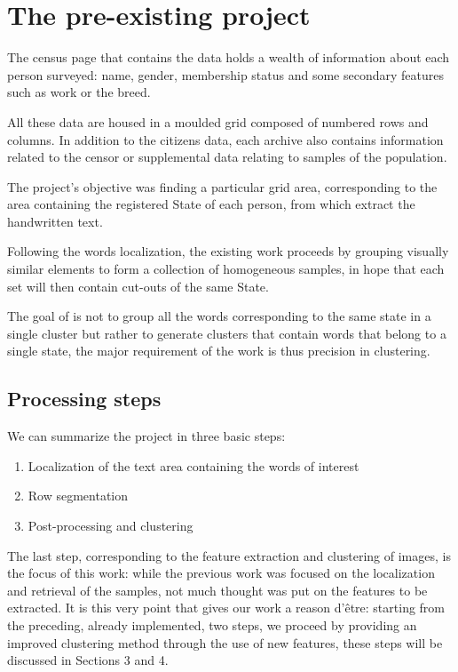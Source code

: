 \section{The pre-existing project}

The census page that contains the data holds a wealth of information about each person surveyed: name, gender, membership status and some secondary features such as work or the breed. 

All these data are housed in a moulded grid composed of numbered rows and columns. In addition to the citizens data, each archive also contains information related to the censor or supplemental data relating to samples of the population.

The project's objective was finding a particular grid area, corresponding to the area containing the registered State of each person, from which extract the handwritten text.

Following the words localization, the existing work proceeds by grouping visually similar elements to form a collection of homogeneous samples, in hope that each set will then contain cut-outs of the same State.

The goal of \cite{vecchioBib} is not to group all the words corresponding to the same state in a single cluster but rather to generate clusters that contain words that belong to a single state, the major requirement of the work is thus precision in clustering.

\subsection{Processing steps}

We can summarize the project in three basic steps:
\begin{enumerate}
\item Localization of the text area containing the words of interest
\item Row segmentation
\item Post-processing and clustering
\end{enumerate}

The last step, corresponding to the feature extraction and clustering of images, is the focus of this work: while the previous work was focused on the localization and retrieval of the samples, not much thought was put on the features to be extracted.
It is this very point that gives our work a reason d'\^etre: starting from the preceding, already implemented, two steps, we proceed by providing an improved clustering method through the use of new features, these steps will be discussed in Sections 3 and 4.

